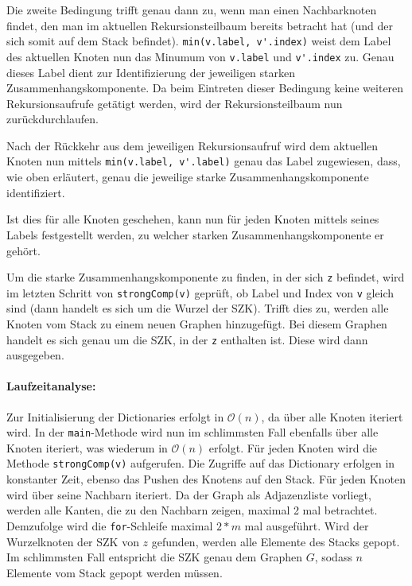 \documentclass[12pt]{scrartcl}%
\theoremstyle{nonumberplain}
\newcommand{\bO}[1]{\mathcal O(#1)}
\newcommand{\code}[1]{\lstinline[basicstyle=\ttfamily\color{black}]{#1}}
\begin{document}
Die zweite Bedingung trifft genau dann zu, wenn man einen Nachbarknoten findet, den man im aktuellen Rekursionsteilbaum bereits betracht hat (und der sich somit auf dem Stack befindet). \code{min(v.label, v'.index)} weist dem Label des aktuellen Knoten nun das Minumum von \code{v.label} und \code{v'.index} zu. Genau dieses Label dient zur Identifizierung der jeweiligen starken Zusammenhangskomponente. Da beim Eintreten dieser Bedingung keine weiteren Rekursionsaufrufe getätigt werden, wird der Rekursionsteilbaum nun zurückdurchlaufen.

Nach der Rückkehr aus dem jeweiligen Rekursionsaufruf wird dem aktuellen Knoten nun mittels \code{min(v.label, v'.label)} genau das Label zugewiesen, dass, wie oben erläutert, genau die jeweilige starke Zusammenhangskomponente identifiziert. 

Ist dies für alle Knoten geschehen, kann nun für jeden Knoten mittels seines Labels festgestellt werden, zu welcher starken Zusammenhangskomponente er gehört.

Um die starke Zusammenhangskomponente zu finden, in der sich \code{z} befindet, wird im letzten Schritt von \code{strongComp(v)} geprüft, ob Label und Index von \code{v} gleich sind (dann handelt es sich um die Wurzel der SZK). Trifft dies zu, werden alle Knoten vom Stack zu einem neuen Graphen hinzugefügt. Bei diesem Graphen handelt es sich genau um die SZK, in der \code{z} enthalten ist. Diese wird dann ausgegeben.

\paragraph{Laufzeitanalyse:} 

Zur Initialisierung der Dictionaries erfolgt in $\bO{n}$, da über alle Knoten iteriert wird. In der \code{main}-Methode wird nun im schlimmsten Fall ebenfalls über alle Knoten iteriert, was wiederum in $\bO{n}$ erfolgt. Für jeden Knoten wird die Methode \code{strongComp(v)} aufgerufen. Die Zugriffe auf das Dictionary erfolgen in konstanter Zeit, ebenso das Pushen des Knotens auf den Stack. Für jeden Knoten wird über seine Nachbarn iteriert. Da der Graph als Adjazenzliste vorliegt, werden alle Kanten, die zu den Nachbarn zeigen, maximal 2 mal betrachtet. Demzufolge wird die \code{for}-Schleife maximal $2*m$ mal ausgeführt. Wird der Wurzelknoten der SZK von $z$ gefunden, werden alle Elemente des Stacks gepopt. Im schlimmsten Fall entspricht die SZK genau dem Graphen $G$, sodass $n$ Elemente vom Stack gepopt werden müssen. 
\end{document}
